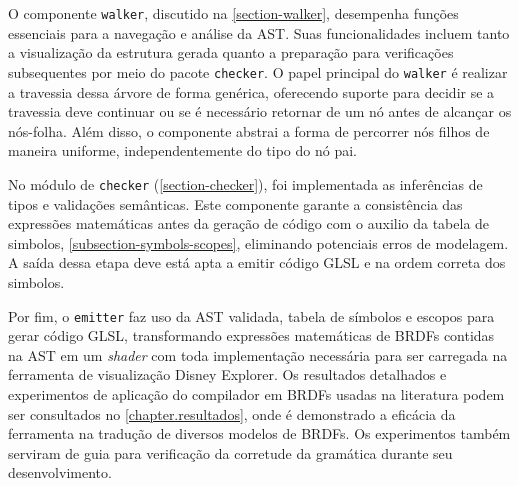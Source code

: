 O componente \texttt{walker}, discutido na \autoref{section-walker}, desempenha funções essenciais para a navegação e análise da AST. Suas funcionalidades incluem tanto a visualização da estrutura gerada quanto a preparação para verificações subsequentes por meio do pacote \texttt{checker}. O papel principal do \texttt{walker} é realizar a travessia dessa árvore de forma genérica, oferecendo suporte para decidir se a travessia deve continuar ou se é necessário retornar de um nó antes de alcançar os nós-folha. Além disso, o componente abstrai a forma de percorrer nós filhos de maneira uniforme, independentemente do tipo do nó pai.

No módulo de \texttt{checker} (\autoref{section-checker}), foi implementada as  inferências de tipos e validações semânticas. Este componente garante a consistência das expressões matemáticas antes da geração de código com o auxilio da tabela de simbolos, \autoref{subsection-symbols-scopes}, eliminando potenciais erros de modelagem. A saída dessa etapa deve está apta a emitir código GLSL e na ordem correta dos simbolos.

Por fim, o \texttt{emitter} faz uso da AST validada, tabela de símbolos e escopos para gerar código GLSL, transformando expressões matemáticas de BRDFs contidas na AST em um \textit{shader} com toda implementação necessária para ser carregada na ferramenta de visualização Disney Explorer. Os resultados detalhados e experimentos de aplicação do compilador em BRDFs usadas na literatura podem ser consultados no \autoref{chapter.resultados}, onde é demonstrado a eficácia da ferramenta na tradução de diversos modelos de BRDFs. Os experimentos também serviram de guia para verificação da corretude da gramática durante seu desenvolvimento.


